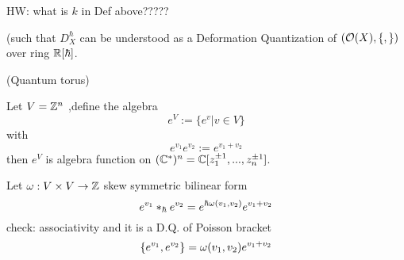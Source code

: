 HW: what is $k$ in Def above?????

(such that $D_X^{\hbar}$ can be understood as a Deformation Quantization of 
$(\mathcal{O}(X),\{,\})$ over ring $\mathbb{R}[\hbar]$.

\begin{example}(Quantum torus)

Let $V=\mathbb{Z}^n$ ,define the algebra 
$$e^{V}:=\{e^v|v\in V\}$$
with 
$$e^{v_1}e^{v_2}:=e^{v_1+v_2}$$
then
$e^V$ is algebra function on $(\mathbb{C}^*)^n=\mathbb{C}[z_1^{\pm 1},...,z_n^{\pm 1}]$.

Let $\omega:V\times V\to \mathbb{Z}$ skew symmetric bilinear form
$$e^{v_1}*_{\hbar}e^{v_2}=e^{\hbar\omega(v_1,v_2)}e^{v_1+v_2}$$
check: associativity and it is a D.Q. of Poisson bracket 
$$\{e^{v_1},e^{v_2}\}=\omega(v_1,v_2)e^{v_1+v_2}$$ 



\end{example}







